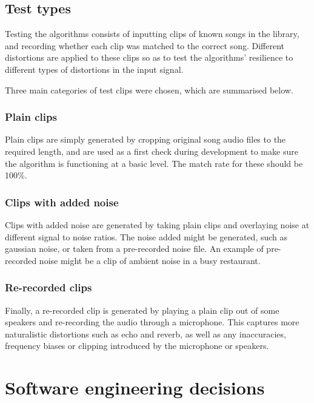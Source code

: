 \documentclass[12pt,a4paper,twoside,openright]{report}
\begin{document}
\subsection{Test types}

Testing the algorithms consists of inputting clips of known songs in the library, and recording whether each clip was matched to the correct song. Different distortions are applied to these clips so as to test the algorithms' resilience to different types of distortions in the input signal.

Three main categories of test clips were chosen, which are summarised below.

\subsubsection{Plain clips}

Plain clips are simply generated by cropping original song audio files to the required length, and are used as a first check during development to make sure the algorithm is functioning at a basic level. The match rate for these should be 100\%.

\subsubsection{Clips with added noise}

Clips with added noise are generated by taking plain clips and overlaying noise at different signal to noise ratios. The noise added might be generated, such as gaussian noise, or taken from a pre-recorded noise file. An example of pre-recorded noise might be a clip of ambient noise in a busy restaurant.

\subsubsection{Re-recorded clips}

Finally, a re-recorded clip is generated by playing a plain clip out of some speakers and re-recording the audio through a microphone. This captures more naturalistic distortions such as echo and reverb, as well as any inaccuracies, frequency biases or clipping introduced by the microphone or speakers.


\section{Software engineering decisions}
\end{document}
